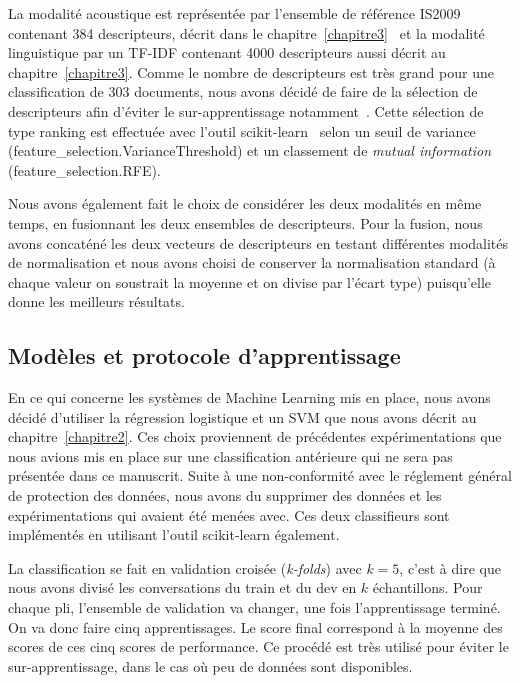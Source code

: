 

La modalité acoustique est représentée par l'ensemble de référence IS2009 contenant 384 descripteurs, décrit dans le chapitre~\ref{chapitre3}~\cite{OPENSMILE} et la modalité linguistique par un TF-IDF contenant 4000 descripteurs aussi décrit au chapitre~\ref{chapitre3}. Comme le nombre de descripteurs est très grand pour une classification de 303 documents, nous avons décidé de faire de la sélection de descripteurs afin d'éviter le sur-apprentissage notamment~\cite{Tahon2016}. Cette sélection de type ranking est effectuée avec l'outil scikit-learn~\cite{scikitlearn} selon un seuil de variance (feature\_selection.VarianceThreshold) et un classement de \textit{mutual information} (feature\_selection.RFE).

Nous avons également fait le choix de considérer les deux modalités en même temps, en fusionnant les deux ensembles de descripteurs. Pour la fusion, nous avons concaténé les deux vecteurs de descripteurs en testant différentes modalités de normalisation et nous avons choisi de conserver la normalisation standard (à chaque valeur on soustrait la moyenne et on divise par l'écart type) puisqu'elle donne les meilleurs résultats.

\subsection{Modèles et protocole d'apprentissage}
En ce qui concerne les systèmes de Machine Learning mis en place, nous avons décidé d'utiliser la régression logistique et un SVM que nous avons décrit au chapitre~\ref{chapitre2}. Ces choix proviennent de précédentes expérimentations que nous avions mis en place sur une classification antérieure qui ne sera pas présentée dans ce manuscrit. Suite à une non-conformité avec le réglement général de protection des données, nous avons du supprimer des données et les expérimentations qui avaient été menées avec. Ces deux classifieurs sont implémentés en utilisant l'outil scikit-learn également. %

La classification se fait en validation croisée (\textit{k-folds}) avec $k=5$, c'est à dire que nous avons divisé les conversations du train et du dev en $k$ échantillons. Pour chaque pli, l'ensemble de validation va changer, une fois l'apprentissage terminé. On va donc faire cinq apprentissages. Le score final correspond à la moyenne des scores de ces cinq scores de performance. Ce procédé est très utilisé pour éviter le sur-apprentissage, dans le cas où peu de données sont disponibles.

